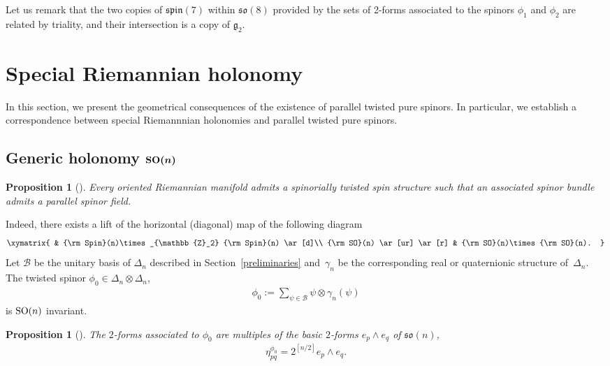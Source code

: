 \documentclass[10pt,a4paper]{amsart}
\numberwithin{equation}{section}
\newtheorem{Proposition}[Theorem]{Proposition}
 { \theoremstyle{definition}
\newtheorem{Definition}[Theorem]{Definition}
\newtheorem{Remark}[Theorem]{Remark}
\newtheorem{Example}[Theorem]{Example}
}
\begin{document}
Let us remark that the two copies of $\mathfrak{spin}(7)$ within $ \mathfrak{so}(8)$ provided by the sets of 2-forms associated to the spinors $\phi_1$ and $\phi_2$ are related by triality, and their intersection is a copy of $\mathfrak{g}_2$.

\section{Special Riemannian holonomy} \label{sec:holonomy}

In this section, we present the geometrical consequences of the existence of parallel twisted pure spinors. In particular, we establish a correspondence between special Riemannnian holonomies and parallel twisted pure spinors.

\subsection[Generic holonomy ${\rm SO}(n)$]{Generic holonomy $\boldsymbol{{\rm SO}(n)}$}

\begin{Proposition}[\cite{Espinosa-Herrera}] Every oriented Riemannian manifold admits a spinorially twisted spin structure such that an associated spinor bundle admits a parallel spinor field.
\end{Proposition}

Indeed, there exists a lift of the horizontal (diagonal) map
of the following diagram
\begin{gather*}
\xymatrix{
 & {\rm Spin}(n)\times_{\mathbb{Z}_2} {\rm Spin}(n) \ar[d]\\
{\rm SO}(n) \ar[ur] \ar[r] & {\rm SO}(n)\times {\rm SO}(n).
}
\end{gather*}
Let $\mathcal{B}$ be the unitary basis of $\Delta_n$ described in Section~\ref{preliminaries} and~$\gamma_n$ be the corresponding real or quaternionic structure of~$\Delta_n$. The twisted spinor $\phi_0\in\Delta_n\otimes \Delta_n$,
\begin{gather*}
\phi_0 := \sum_{\psi\in\mathcal{B}} \psi\otimes \gamma_n(\psi)
\end{gather*}
is ${\rm SO}(n)$ invariant.

\begin{Proposition}[\cite{Espinosa-Herrera}] The $2$-forms associated to $\phi_0$ are multiples of the basic $2$-forms $e_p\wedge e_q$ of $\mathfrak{so}(n)$,
\begin{gather*}\eta_{pq}^{\phi_0} = 2^{[n/2]} e_p\wedge e_q.\end{gather*}
\end{Proposition}
\end{document}
